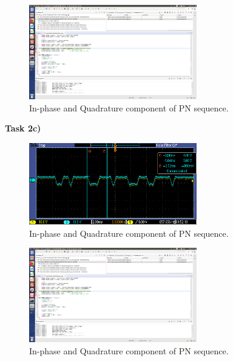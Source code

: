 \documentclass{article}
\begin{document}
\begin{figure}[h]
  \begin{center}
    \includegraphics[width=0.65\textwidth]{img/task_2_c_profile.png}
    \caption{In-phase and Quadrature component of PN sequence.}
  \end{center}
\end{figure}

\pagebreak
\textbf{Task 2c)}

\begin{figure}[h]
  \begin{center}
    \includegraphics[width=0.65\textwidth]{img/task_2_c_oscilloscope.png}
    \caption{In-phase and Quadrature component of PN sequence.}
  \end{center}
\end{figure}

\begin{figure}[h]
  \begin{center}
    \includegraphics[width=0.65\textwidth]{img/task_2_c_profile.png}
    \caption{In-phase and Quadrature component of PN sequence.}
  \end{center}
\end{figure}
\end{document}
